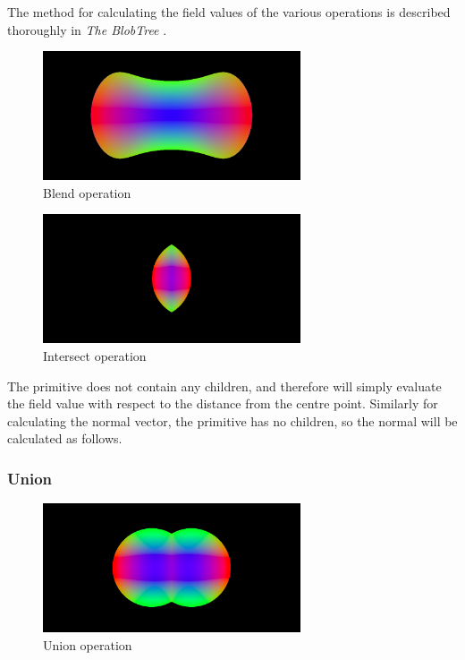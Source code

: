 \documentclass[conference]{acmsiggraph}
\begin{document}
The method for calculating the field values of the various operations is
described thoroughly in \textit{The BlobTree} \cite{Wyvill}.

\begin{figure}[htbp]
	\centering
	\includegraphics[height=1.5in]{images/blend.png}
	\caption{Blend operation}
\end{figure}



\begin{figure}[htbp]
	\centering
	\includegraphics[height=1.5in]{images/intersect.png}
	\caption{Intersect operation}
\end{figure}

The primitive does not contain any children, and therefore will simply
evaluate the field value with respect to the distance from the centre point.
Similarly for calculating the normal vector, the primitive has no children, so
the normal will be calculated as follows.

\subsubsection{Union}
\begin{figure}[htbp]
	\centering
	\includegraphics[height=1.5in]{images/union.png}
	\caption{Union operation}
\end{figure}
\end{document}

